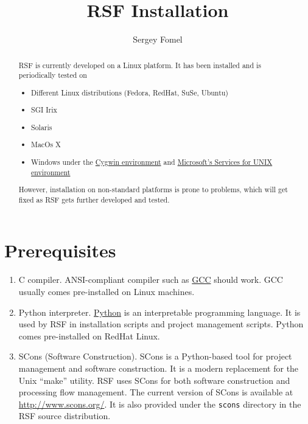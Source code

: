 \title{RSF Installation}
\author{Sergey Fomel}

%

\maketitle

\begin{abstract}
RSF is currently developed on a Linux platform. It has been installed and is
periodically tested on
\begin{itemize}
\item Different Linux distributions (Fedora, RedHat, SuSe, Ubuntu)
\item SGI Irix
\item Solaris
\item MacOs X
\item Windows under the \href{http://www.cygwin.com/}{Cygwin environment} and 
\href{http://www.microsoft.com/technet/interopmigration/unix/sfu/default.mspx}{Microsoft's Services for UNIX environment}
\end{itemize}
However, installation on non-standard platforms is prone to problems, which
will get fixed as RSF gets further developed and tested.
\end{abstract}

\section{Prerequisites}

\begin{enumerate}
\item C compiler. ANSI-compliant compiler such as
  \href{http://gcc.gnu.org/}{GCC} should work. GCC usually comes pre-installed
  on Linux machines.
\item Python interpreter. \href{http://www.python.org/}{Python} is an
  interpretable programming language. It is used by RSF in installation
  scripts and project management scripts.  Python comes pre-installed on
  RedHat Linux.
\item SCons (Software Construction). SCons is a Python-based tool for project
  management and software construction. It is a modern replacement for the
  Unix ``make'' utility. RSF uses SCons for both software construction and
  processing flow management. The current version of SCons is available at
  \url{http://www.scons.org/}. It is also provided under the \texttt{scons}
  directory in the RSF source distribution.
\end{enumerate}

